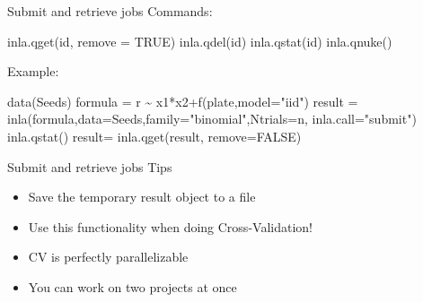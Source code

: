 \documentclass[
  ignorenonframetext,
]{beamer}
\newenvironment{Shaded}{\begin{snugshade}}{\end{snugshade}}
\newcommand{\AttributeTok}[1]{\textcolor[rgb]{0.77,0.63,0.00}{#1}}
\newcommand{\ConstantTok}[1]{\textcolor[rgb]{0.00,0.00,0.00}{#1}}
\newcommand{\FunctionTok}[1]{\textcolor[rgb]{0.00,0.00,0.00}{#1}}
\newcommand{\NormalTok}[1]{#1}
\newcommand{\OtherTok}[1]{\textcolor[rgb]{0.56,0.35,0.01}{#1}}
\newcommand{\SpecialCharTok}[1]{\textcolor[rgb]{0.00,0.00,0.00}{#1}}
\newcommand{\StringTok}[1]{\textcolor[rgb]{0.31,0.60,0.02}{#1}}
\begin{document}
\begin{frame}[fragile]{Submit and retrieve jobs}
\protect\hypertarget{submit-and-retrieve-jobs}{}
Commands: \small

\begin{Shaded}
\begin{Highlighting}[]
  \FunctionTok{inla.qget}\NormalTok{(id, }\AttributeTok{remove =} \ConstantTok{TRUE}\NormalTok{)}
  \FunctionTok{inla.qdel}\NormalTok{(id)}
  \FunctionTok{inla.qstat}\NormalTok{(id)}
  \FunctionTok{inla.qnuke}\NormalTok{()}
\end{Highlighting}
\end{Shaded}

\normalsize

Example: \small

\begin{Shaded}
\begin{Highlighting}[]
\FunctionTok{data}\NormalTok{(Seeds)}
\NormalTok{formula }\OtherTok{=}\NormalTok{ r }\SpecialCharTok{\textasciitilde{}}\NormalTok{ x1}\SpecialCharTok{*}\NormalTok{x2}\SpecialCharTok{+}\FunctionTok{f}\NormalTok{(plate,}\AttributeTok{model=}\StringTok{"iid"}\NormalTok{)}
\NormalTok{result }\OtherTok{=} \FunctionTok{inla}\NormalTok{(formula,}\AttributeTok{data=}\NormalTok{Seeds,}\AttributeTok{family=}\StringTok{"binomial"}\NormalTok{,}\AttributeTok{Ntrials=}\NormalTok{n, }\AttributeTok{inla.call=}\StringTok{"submit"}\NormalTok{)}
\FunctionTok{inla.qstat}\NormalTok{()}
\NormalTok{result}\OtherTok{=} \FunctionTok{inla.qget}\NormalTok{(result, }\AttributeTok{remove=}\ConstantTok{FALSE}\NormalTok{)}
\end{Highlighting}
\end{Shaded}

\normalsize
\end{frame}

\begin{frame}{Submit and retrieve jobs}
\protect\hypertarget{submit-and-retrieve-jobs-1}{}
Tips

\begin{itemize}
\item
  Save the temporary result object to a file
\item
  Use this functionality when doing Cross-Validation!
\item
  CV is perfectly parallelizable
\item
  You can work on two projects at once
\end{itemize}
\end{frame}
\end{document}
